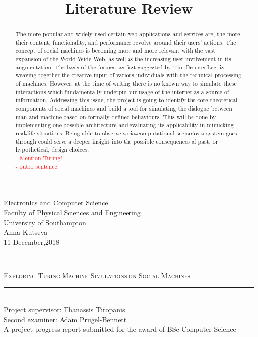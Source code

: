 \documentclass[12pt,a4,xcolor=table]{article}
\title{Literature Review}
\author{}
\date{}
\begin{document}
	\begin{titlepage}
		\newcommand{\HRule}{\rule{\linewidth}{0.5mm}}
		\center
		\Large Electronics and Computer Science\\
		\Large Faculty of Physical Sciences and Engineering\\
		\Large University of Southampton\\[1.5cm]
		\Huge Anna Kutseva\\
		{\large 11 December,2018}\\[3cm]
		\HRule \\[0.4cm]
		\textsc{{\huge Exploring Turing Machine Simulations on Social Machines }}\\[0.3cm]
		\HRule \\[1.5cm]
		\LARGE Project supervisor: Thanassis Tiropanis \\
		\LARGE Second examiner: Adam Prugel-Bennett \\[1.5cm]
		\Large A project progress report submitted for the award of BSc Computer Science \\[1.5cm]
	\end{titlepage}
	\tableofcontents
	\thispagestyle{empty}
	\newpage
	\begin{abstract}
		The more popular and widely used certain web applications and services are, the more their content, functionality, and performance revolve around their users' actions.
		The concept of social machines is becoming more and more relevant with the vast expansion of the World Wide Web, as well as the increasing user involvement in its augmentation. The basis of the former, as first suggested by Tim Berners Lee, is weaving together the creative input of various individuals with the technical processing of machines.
		However, at the time of writing there is no known way to simulate these interactions which fundamentally underpin our usage of the internet as a source of information. Addressing this issue, the project is going to identify the core theoretical components of social machines and build a tool for simulating the dialogue between man and machine based on formally defined behaviours.
		This will be done by implementing one possible architecture and evaluating its applicability in mimicking real-life situations.
		Being able to observe socio-computational scenarios a system goes through could serve a deeper insight into the possible consequences of past, or hypothetical, design choices.
	\textcolor{red}{
		\\- Mention Turing!
		\\- outro sentence!	
	}
	\end{abstract}
	\thispagestyle{empty}
	\clearpage
	
\end{document}
